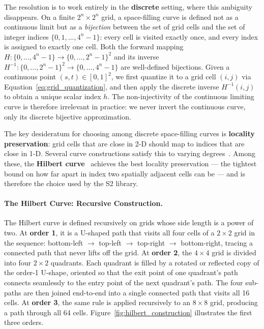 \documentclass{book}
\begin{document}
The resolution is to work entirely in the \textbf{discrete} setting,
where this ambiguity disappears.  On a finite $2^n \times 2^n$ grid,
a space-filling curve is defined not as a continuous limit but as a
\emph{bijection} between the set of grid cells and the set of integer
indices $\{0, 1, \ldots, 4^n - 1\}$: every cell is visited exactly
once, and every index is assigned to exactly one cell.  Both the
forward mapping $H: \{0, \ldots, 4^n-1\} \to \{0,\ldots,2^n-1\}^2$
and its inverse $H^{-1}: \{0,\ldots,2^n-1\}^2 \to \{0,\ldots,4^n-1\}$
are well-defined bijections.  Given a continuous point
$(s,t) \in [0,1]^2$, we first quantize it to a grid cell $(i,j)$
via Equation~\eqref{eq:grid_quantization}, and then apply the
discrete inverse $H^{-1}(i,j)$ to obtain a unique scalar index $h$.
The non-injectivity of the continuous limiting curve is therefore
irrelevant in practice: we never invert the continuous curve, only
its discrete bijective approximation.

The key desideratum for choosing among discrete space-filling curves
is \textbf{locality preservation}: grid cells that are close in 2-D
should map to indices that are close in 1-D.  Several curve constructions
satisfy this to varying degrees~\cite{sagan1994space}.  Among these, the
\textbf{Hilbert curve}~\cite{hilbert1891} achieves the best locality
preservation --- the tightest bound on how far apart in index two
spatially adjacent cells can be --- and is therefore the choice used
by the S2 library.


\paragraph{The Hilbert Curve: Recursive Construction.}

The Hilbert curve is defined recursively on grids whose side length
is a power of two.  At \textbf{order 1}, it is a U-shaped path that
visits all four cells of a $2 \times 2$ grid in the sequence:
bottom-left $\to$ top-left $\to$ top-right $\to$ bottom-right,
tracing a connected path that never lifts off the grid.  At
\textbf{order 2}, the $4 \times 4$ grid is divided into four $2
\times 2$ quadrants.  Each quadrant is filled by a rotated or
reflected copy of the order-1 U-shape, oriented so that the exit
point of one quadrant's path connects seamlessly to the entry point
of the next quadrant's path.  The four sub-paths are then joined
end-to-end into a single connected path that visits all 16 cells.
At \textbf{order 3}, the same rule is applied recursively to an $8
\times 8$ grid, producing a path through all 64 cells.
Figure~\ref{fig:hilbert_construction} illustrates the first three
orders.
\end{document}
